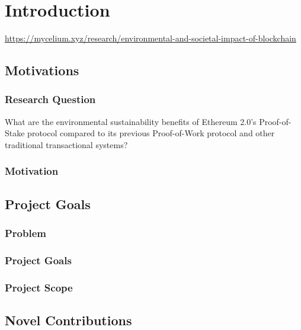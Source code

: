 \chapter{Introduction}
\url{https://mycelium.xyz/research/environmental-and-societal-impact-of-blockchain}
\section{Motivations}

\subsection{Research Question}

What are the environmental sustainability benefits of Ethereum 2.0's Proof-of-Stake protocol compared to its previous Proof-of-Work protocol and other traditional transactional systems?

\subsection{Motivation}

\section{Project Goals}
\subsection{Problem}
\subsection{Project Goals}
\subsection{Project Scope}

\section{Novel Contributions}